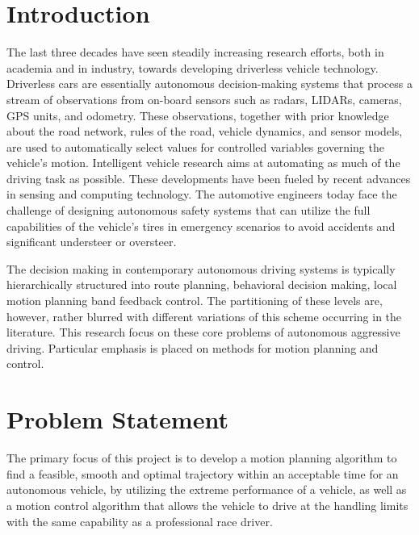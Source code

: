 \documentclass[conference, onecolumn]{IEEEtran}
\begin{document}
\section{Introduction}
The last three decades have seen steadily increasing research efforts, both in academia and in industry, towards developing driverless vehicle technology. Driverless cars are essentially autonomous decision-making systems that process a stream of observations from on-board sensors such as radars, LIDARs, cameras, GPS units, and odometry. These observations, together with prior knowledge about the road network, rules of the road, vehicle dynamics, and sensor models, are used to automatically select values for controlled variables governing the vehicle’s motion. Intelligent vehicle research aims at automating as much of the driving task as possible. These developments have been fueled by recent advances in sensing and computing technology. The automotive engineers today face the challenge of designing autonomous safety systems that can utilize the full capabilities of the vehicle’s tires in emergency scenarios to avoid accidents and significant understeer or oversteer\cite{eskandarian2021research}\cite{Li2010OnTD}. %

The decision making in contemporary autonomous driving systems is typically hierarchically structured into route planning, behavioral decision making, local motion planning band feedback control\cite{paden2016survey}. The partitioning of these levels are, however, rather blurred with different variations of this scheme occurring in the literature. This research focus on these core problems of autonomous aggressive driving. Particular emphasis is placed on methods for motion planning and control. 

\section{Problem Statement}
The primary focus of this project is to develop a motion planning algorithm to find a feasible, smooth and optimal trajectory within an acceptable time for an autonomous vehicle, by utilizing the extreme performance of a vehicle, as well as a motion control algorithm that allows the vehicle to drive at the handling limits with the same capability as a professional race driver. 
\end{document}
